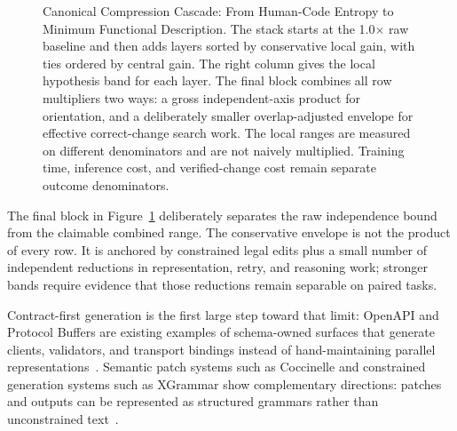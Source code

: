 \begin{figure}[t]
\caption{Canonical Compression Cascade: From Human-Code Entropy to Minimum Functional Description. The stack starts at the 1.0$\times$ raw baseline and then adds layers sorted by conservative local gain, with ties ordered by central gain. The right column gives the local hypothesis band for each layer. The final block combines all row multipliers two ways: a gross independent-axis product for orientation, and a deliberately smaller overlap-adjusted envelope for effective correct-change search work. The local ranges are measured on different denominators and are not naively multiplied. Training time, inference cost, and verified-change cost remain separate outcome denominators.}
\label{fig:compressioncascade}
\end{figure}

The final block in Figure~\ref{fig:compressioncascade} deliberately separates the raw independence bound from the claimable combined range. The conservative envelope is not the product of every row. It is anchored by constrained legal edits plus a small number of independent reductions in representation, retry, and reasoning work; stronger bands require evidence that those reductions remain separable on paired tasks.

Contract-first generation is the first large step toward that limit: OpenAPI and Protocol Buffers are existing examples of schema-owned surfaces that generate clients, validators, and transport bindings instead of hand-maintaining parallel representations~\cite{openapi31,protobufOverview}. Semantic patch systems such as Coccinelle and constrained generation systems such as XGrammar show complementary directions: patches and outputs can be represented as structured grammars rather than unconstrained text~\cite{coccinelle,xgrammar}.

